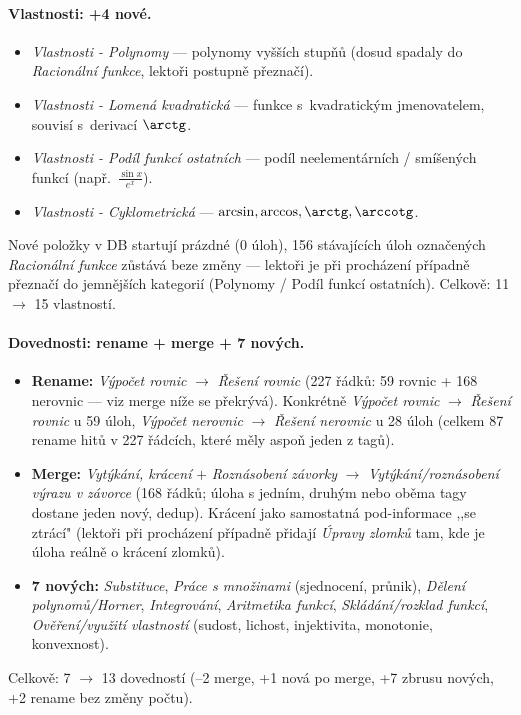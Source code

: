 \documentclass[11pt,a4paper]{article}
\begin{document}
\paragraph{Vlastnosti: +4 nové.}
\begin{itemize}
  \item \emph{Vlastnosti - Polynomy} --- polynomy vyšších stupňů (dosud spadaly do \emph{Racionální funkce}, lektoři postupně přeznačí).
  \item \emph{Vlastnosti - Lomená kvadratická} --- funkce s~kvadratickým jmenovatelem, souvisí s~derivací $\arctg$.
  \item \emph{Vlastnosti - Podíl funkcí ostatních} --- podíl neelementárních / smíšených funkcí (např.~$\frac{\sin x}{e^x}$).
  \item \emph{Vlastnosti - Cyklometrická} --- $\arcsin, \arccos, \arctg, \arccotg$.
\end{itemize}
Nové položky v DB startují prázdné (0 úloh), 156 stávajících úloh označených \emph{Racionální funkce} zůstává beze změny --- lektoři je při procházení případně přeznačí do jemnějších kategorií (Polynomy / Podíl funkcí ostatních). Celkově: 11 $\rightarrow$ 15 vlastností.

\paragraph{Dovednosti: rename + merge + 7 nových.}
\begin{itemize}
  \item \textbf{Rename:} \emph{Výpočet rovnic} $\rightarrow$ \emph{Řešení rovnic} (227 řádků: 59 rovnic + 168 nerovnic --- viz merge níže se překrývá). Konkrétně \emph{Výpočet rovnic} $\rightarrow$ \emph{Řešení rovnic} u 59 úloh, \emph{Výpočet nerovnic} $\rightarrow$ \emph{Řešení nerovnic} u 28 úloh (celkem 87 rename hitů v 227 řádcích, které měly aspoň jeden z tagů).
  \item \textbf{Merge:} \emph{Vytýkání, krácení} $+$ \emph{Roznásobení závorky} $\rightarrow$ \emph{Vytýkání/roznásobení výrazu v závorce} (168 řádků; úloha s jedním, druhým nebo oběma tagy dostane jeden nový, dedup). Krácení jako samostatná pod-informace ,,se ztrácí" (lektoři při procházení případně přidají \emph{Úpravy zlomků} tam, kde je úloha reálně o krácení zlomků).
  \item \textbf{7 nových:} \emph{Substituce}, \emph{Práce s množinami} (sjednocení, průnik), \emph{Dělení polynomů/Horner}, \emph{Integrování}, \emph{Aritmetika funkcí}, \emph{Skládání/rozklad funkcí}, \emph{Ověření/využití vlastností} (sudost, lichost, injektivita, monotonie, konvexnost).
\end{itemize}
Celkově: 7 $\rightarrow$ 13 dovedností (--2 merge, +1 nová po merge, +7 zbrusu nových, +2 rename bez změny počtu).
\end{document}
